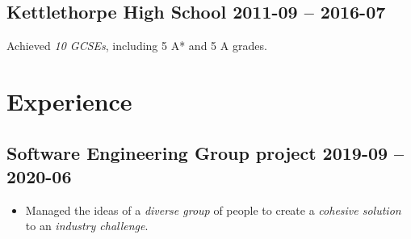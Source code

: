 \documentclass[cv.tex]{subfiles}
\begin{document}
    \subsection{Kettlethorpe High School
       \hfill 2011-09 -- 2016-07}
       Achieved \emph{10 GCSEs}, including 5 A* and 5 A grades\footnotemark[2].
\section{Experience}
    \subsection{Software Engineering Group project
    \hfill 2019-09 -- 2020-06}
        \begin{itemize}
            \item Managed the ideas of a \emph{diverse group} of people to
                create a \emph{cohesive solution} to an \emph{industry
                challenge}.
        \end{itemize}
\end{document}
